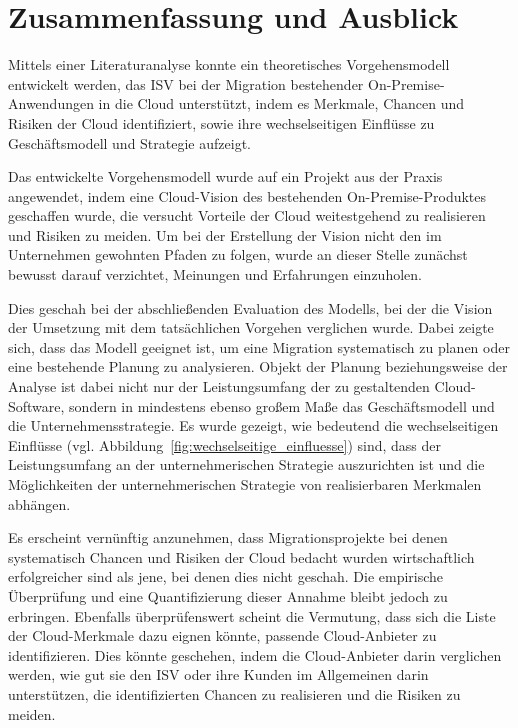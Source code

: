 \section{Zusammenfassung und Ausblick}
\label{cha:fazit}
Mittels einer Literaturanalyse konnte ein theoretisches Vorgehensmodell 
entwickelt werden, das ISV bei der Migration bestehender On-Premise-Anwendungen 
in die Cloud unterstützt, indem es Merkmale, Chancen und Risiken der Cloud 
identifiziert, sowie ihre wechselseitigen Einflüsse zu Geschäftsmodell und 
Strategie aufzeigt. 

Das entwickelte Vorgehensmodell wurde auf ein Projekt aus der Praxis 
angewendet, indem eine Cloud-Vision des bestehenden On-Premise-Produktes 
geschaffen wurde, die versucht Vorteile der Cloud weitestgehend zu realisieren 
und Risiken zu meiden. Um bei der Erstellung der Vision nicht den im 
Unternehmen gewohnten Pfaden zu folgen, wurde an dieser Stelle zunächst 
bewusst darauf verzichtet, Meinungen und Erfahrungen einzuholen.

Dies geschah bei der abschließenden Evaluation des Modells, bei der die Vision 
der Umsetzung mit dem tatsächlichen Vorgehen verglichen wurde. Dabei zeigte 
sich, dass das Modell geeignet ist, um eine Migration systematisch zu planen 
oder eine bestehende Planung zu analysieren. Objekt der Planung beziehungsweise 
der Analyse ist dabei nicht nur der Leistungsumfang der zu gestaltenden 
Cloud-Software, sondern in mindestens ebenso großem Maße das Geschäftsmodell und 
die Unternehmensstrategie. Es wurde gezeigt, wie bedeutend die 
wechselseitigen Einflüsse (vgl. Abbildung~\ref{fig:wechselseitige_einfluesse}) 
sind, dass der Leistungsumfang an der unternehmerischen Strategie auszurichten 
ist und die Möglichkeiten der unternehmerischen Strategie von realisierbaren 
Merkmalen abhängen.

Es erscheint vernünftig anzunehmen, dass Migrationsprojekte bei denen 
systematisch Chancen und Risiken der Cloud bedacht wurden wirtschaftlich 
erfolgreicher sind als jene, bei denen dies nicht geschah. Die empirische 
Überprüfung und eine Quantifizierung dieser Annahme bleibt jedoch zu erbringen. Ebenfalls 
überprüfenswert scheint die Vermutung, dass sich die Liste der Cloud-Merkmale 
dazu eignen könnte, passende Cloud-Anbieter zu identifizieren. Dies könnte 
geschehen, indem die Cloud-Anbieter darin verglichen werden, wie gut sie den 
ISV oder ihre Kunden im Allgemeinen darin unterstützen, die identifizierten 
Chancen zu realisieren und die Risiken zu meiden.

